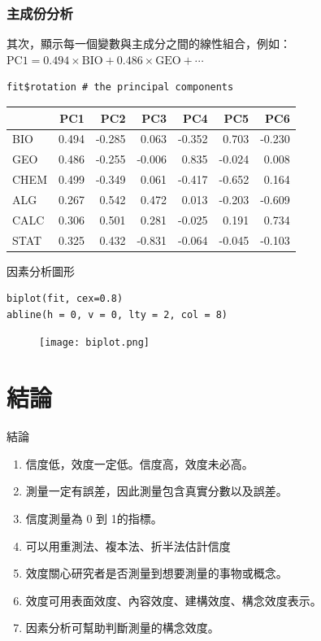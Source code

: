 \documentclass[xcolor=dvipsnames, 13pt]{beamer}
\begin{document}
\begin{frame}[fragile]\frametitle{主成份分析}
其次，顯示每一個變數與主成分之間的線性組合，例如：$\textrm{PC1} = 0.494\times \textrm{BIO}
 + 0.486\times \textrm{GEO} + \cdots$
\bigskip
\begin{Verbatim}[frame=single,label=\textit{R code}]
 fit$rotation # the principal components
\end{Verbatim}
\begin{table}
\begin{tabular}{| l | r | r | r | r | r | r |}
\hline
    &  PC1  &  PC2  &  PC3 &    PC4  &   PC5 & PC6\\
\hline
BIO  & 0.494 & -0.285  & 0.063 & -0.352 &  0.703 & -0.230\\
GEO  & 0.486 & -0.255 & -0.006 &  0.835 & -0.024 &  0.008\\
CHEM & 0.499 & -0.349 &  0.061 & -0.417 &  -0.652 &  0.164\\
ALG  & 0.267  & 0.542 &  0.472 &  0.013 & -0.203 & -0.609\\
CALC & 0.306  & 0.501 &  0.281 & -0.025 &  0.191 &  0.734\\
STAT & 0.325  & 0.432 & -0.831 & -0.064 & -0.045 & -0.103\\
\hline
\end{tabular}
\end{table}
\end{frame}
\begin{frame}[fragile=singleslide]{因素分析圖形}

\begin{Verbatim}[frame=single,label=\textit{R code}]
biplot(fit, cex=0.8)
abline(h = 0, v = 0, lty = 2, col = 8)
\end{Verbatim}

\begin{figure}
\begin{center}
\texttt{[image: biplot.png]}
\end{center}
\end{figure}
\end{frame}
\section{結論}
\begin{frame}{結論}
\begin{enumerate}
\item 信度低，效度一定低。信度高，效度未必高。
\item 測量一定有誤差，因此測量包含真實分數以及誤差。
\item 信度測量為 0 到 1的指標。
\item 可以用重測法、複本法、折半法估計信度
\item 效度關心研究者是否測量到想要測量的事物或概念。
\item 效度可用表面效度、內容效度、建構效度、構念效度表示。
\item 因素分析可幫助判斷測量的構念效度。
\end{enumerate}
\end{frame}
\end{document}
